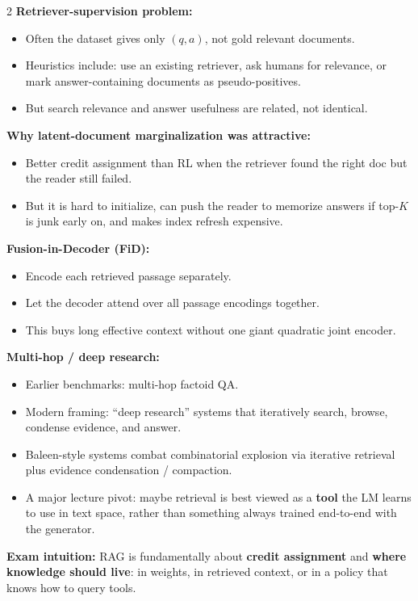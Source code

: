 \documentclass[10pt]{article}
\begin{document}
\begin{multicols*}{2}
\textbf{Retriever-supervision problem:}
\begin{itemize}
\item Often the dataset gives only \((q,a)\), not gold relevant documents.
\item Heuristics include: use an existing retriever, ask humans for relevance, or mark answer-containing documents as pseudo-positives.
\item But search relevance and answer usefulness are related, not identical.
\end{itemize}

\textbf{Why latent-document marginalization was attractive:}
\begin{itemize}
\item Better credit assignment than RL when the retriever found the right doc but the reader still failed.
\item But it is hard to initialize, can push the reader to memorize answers if top-\(K\) is junk early on, and makes index refresh expensive.
\end{itemize}

\textbf{Fusion-in-Decoder (FiD):}
\begin{itemize}
\item Encode each retrieved passage separately.
\item Let the decoder attend over all passage encodings together.
\item This buys long effective context without one giant quadratic joint encoder.
\end{itemize}

\textbf{Multi-hop / deep research:}
\begin{itemize}
\item Earlier benchmarks: multi-hop factoid QA.
\item Modern framing: ``deep research'' systems that iteratively search, browse, condense evidence, and answer.
\item Baleen-style systems combat combinatorial explosion via iterative retrieval plus evidence condensation / compaction.
\item A major lecture pivot: maybe retrieval is best viewed as a \textbf{tool} the LM learns to use in text space, rather than something always trained end-to-end with the generator.
\end{itemize}

\textbf{Exam intuition:} RAG is fundamentally about \textbf{credit assignment} and \textbf{where knowledge should live}: in weights, in retrieved context, or in a policy that knows how to query tools.


\end{multicols*}
\end{document}

